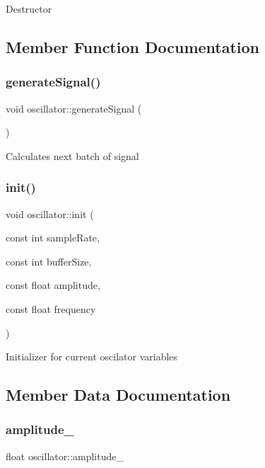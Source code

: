 Destructor 

\subsection{Member Function Documentation}
\mbox{\label{classoscillator_a96348895fa640d490c96be06988d300c}} 
\subsubsection{\texorpdfstring{generate\+Signal()}{generateSignal()}}
{\footnotesize\ttfamily void oscillator\+::generate\+Signal (\begin{DoxyParamCaption}{ }\end{DoxyParamCaption})}

Calculates next batch of signal \mbox{\label{classoscillator_ae1011086527d1596f735bbf3d8fc2fa7}} 
\subsubsection{\texorpdfstring{init()}{init()}}
{\footnotesize\ttfamily void oscillator\+::init (\begin{DoxyParamCaption}\item[{const int}]{sample\+Rate,  }\item[{const int}]{buffer\+Size,  }\item[{const float}]{amplitude,  }\item[{const float}]{frequency }\end{DoxyParamCaption})}

Initializer for current oscilator variables 

\subsection{Member Data Documentation}
\mbox{\label{classoscillator_a5671a761666b50a469a4121ef0e0e864}} 
\subsubsection{\texorpdfstring{amplitude\+\_\+}{amplitude\_}}
{\footnotesize\ttfamily float oscillator\+::amplitude\+\_\+\hspace{0.3cm}{\ttfamily [protected]}}

